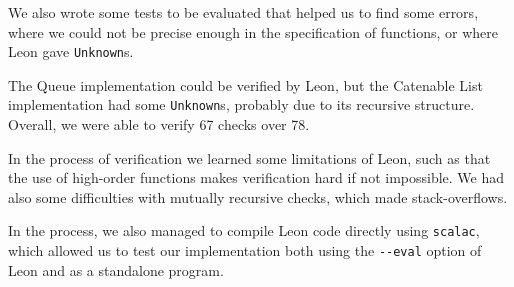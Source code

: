 We also wrote some tests to be evaluated that helped us to find some errors,
where we could not be precise enough in the specification of functions,
or where Leon gave \verb|Unknown|s.

The Queue implementation could be verified by Leon,
but the Catenable List implementation had some \verb|Unknown|s,
probably due to its recursive structure. Overall, we were able to verify 67 checks over 78.

In the process of verification we learned some limitations of Leon,
such as that the use of high-order functions makes verification hard if not impossible.
We had also some difficulties with mutually recursive checks, 
which made stack-overflows.

In the process, we also managed to compile Leon code directly using \verb|scalac|, 
which allowed us to test our implementation both using the \verb|--eval| option of
Leon and as a standalone program.

